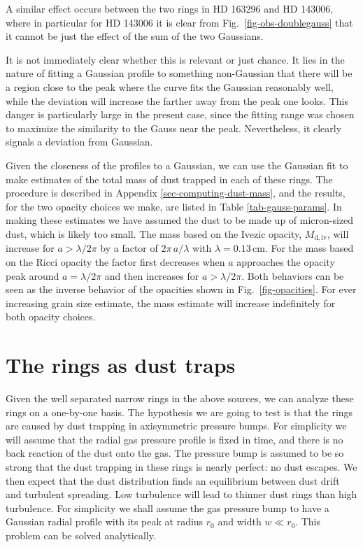 \documentclass{aa}
\begin{document}
A similar effect occurs between the two rings in HD 163296 and HD 143006, where
in particular for HD 143006 it is clear from Fig.~\ref{fig-obs-doublegauss} that
it cannot be just the effect of the sum of the two Gaussians.

It is not immediately clear whether this is relevant or just chance. It lies in
the nature of fitting a Gaussian profile to something non-Gaussian that there
will be a region close to the peak where the curve fits the Gaussian reasonably
well, while the deviation will increase the farther away from the peak one
looks. This danger is particularly large in the present case, since the fitting
range was chosen to maximize the similarity to the Gauss near the
peak. Nevertheless, it clearly signals a deviation from Gaussian.

Given the closeness of the profiles to a Gaussian, we can use the Gaussian fit
to make estimates of the total mass of dust trapped in each of these rings. The
procedure is described in Appendix \ref{sec-computing-dust-mass}, and the
results, for the two opacity choices we make, are listed in Table
\ref{tab-gauss-params}. In making these estimates we have assumed the dust to be
made up of micron-sized dust, which is likely too small. The mass based on the
Ivezic opacity, $M_{\mathrm{d,iv}}$, will increase for $a>\lambda/2\pi$ by a
factor of $2\pi\,a/\lambda$ with $\lambda=0.13\,\mathrm{cm}$. For the mass based
on the Ricci opacity the factor first decreases when $a$ approaches the opacity
peak around $a=\lambda/2\pi$ and then increases for $a>\lambda/2\pi$. Both
behaviors can be seen as the inverse behavior of the opacities shown in
Fig.~\ref{fig-opacities}. For ever increasing grain size estimate, the mass
estimate will increase indefinitely for both opacity choices. 



\section{The rings as dust traps}
\label{sec-rings-as-dust-traps}
%
Given the well separated narrow rings in the above sources, we can analyze these
rings on a one-by-one basis. The hypothesis we are going to test is that the
rings are caused by dust trapping in axisymmetric pressure bumps. For simplicity
we will assume that the radial gas pressure profile is fixed in time, and there
is no back reaction of the dust onto the gas. The pressure bump is assumed to be
so strong that the dust trapping in these rings is nearly perfect: no dust
escapes. We then expect that the dust distribution finds an equilibrium between
dust drift and turbulent spreading. Low turbulence will lead to thinner dust
rings than high turbulence. For simplicity we shall assume the gas pressure bump
to have a Gaussian radial profile with its peak at radius $r_0$ and width $w\ll
r_0$. This problem can be solved analytically.
\end{document}
